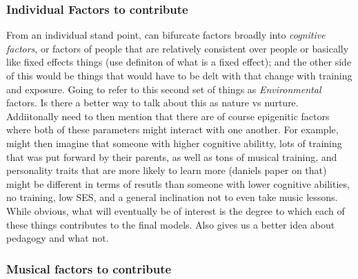 \documentclass[]{book}
\theoremstyle{definition}
\theoremstyle{definition}
\theoremstyle{definition}
\theoremstyle{remark}
\begin{document}
\hypertarget{individual-factors-to-contribute}{%
\subsubsection{Individual Factors to
contribute}\label{individual-factors-to-contribute}}

From an individual stand point, can bifurcate factors broadly into
\emph{cognitive factors}, or factors of people that are relatively
consistent over people or basically like fixed effects things (use
definiton of what is a fixed effect); and the other side of this would
be things that would have to be delt with that change with training and
exposure. Going to refer to this second set of things as
\emph{Environmental} factors. Is there a better way to talk about this
as nature vs nurture. Addiitonally need to then mention that there are
of course epigenitic factors where both of these parameters might
interact with one another. For example, might then imagine that someone
with higher cognitive abilitty, lots of training that was put forward by
their parents, as well as tons of musical training, and personality
traits that are more likely to learn more (daniels paper on that) might
be different in terms of resutls than someone with lower cognitive
abilities, no training, low SES, and a general inclination not to even
take music lessons. While obvious, what will eventually be of interest
is the degree to which each of these things contributes to the final
models. Also gives us a better idea about pedagogy and what not.

\hypertarget{musical-factors-to-contribute}{%
\subsubsection{Musical factors to
contribute}\label{musical-factors-to-contribute}}
\end{document}
